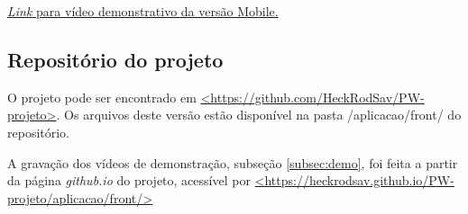 \href{https://youtu.be/rhEI6m4BFxc}{\emph{Link} para vídeo demonstrativo da versão Mobile.}

\subsection{Repositório do projeto}

O projeto pode ser encontrado em \href{https://github.com/HeckRodSav/PW-projeto}{<https://github.com/HeckRodSav/PW-projeto>}.
Os arquivos deste versão estão disponível na pasta /aplicacao/front/ do repositório.

A gravação dos vídeos de demonstração, subseção \ref{subsec:demo}, foi feita a partir da página \emph{github.io} do projeto, acessível por \href{https://heckrodsav.github.io/PW-projeto/aplicacao/front/}{<https://heckrodsav.github.io/PW-projeto/aplicacao/front/>}